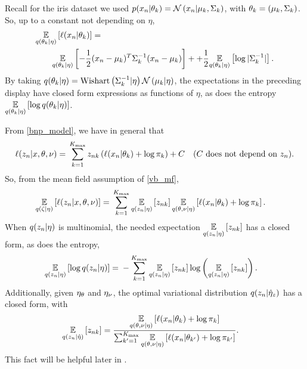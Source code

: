 \begin{ex}
%
Recall for the iris dataset we used $p(x_n \vert \theta_k) = \mathcal{N}\left(x_n \vert
\mu_k, \Sigma_k\right)$, with $\theta_k = (\mu_k, \Sigma_k)$.  So,
up to a constant not depending on $\eta$,
%
\begin{align*}
%
\MoveEqLeft
\expect{\q(\theta_\k \vert \eta)}{\logp(\x_\n \vert \theta_\k)} =\\
&
\expect{\q(\theta_\k \vert \eta)}{
-\frac{1}{2}(\x_n - \mu_k)^T \Sigma_\k^{-1} (\x_n - \mu_k)} +
+\frac{1}{2} \expect{\q(\theta_\k \vert \eta)}{\log |\Sigma_\k^{-1}|}.
%
\end{align*}
%
By taking $q(\theta_k \vert \eta) = \mathrm{Wishart}\left(\Sigma_k^{-1} \vert \eta\right)
\mathcal{N}\left(\mu_k \vert \eta\right)$, the expectations in the preceding display have closed
form expressions as functions of $\eta$, as does the entropy
$\underset{q(\theta_k \vert \eta)}{\mathbb{E}}\left[\log q(\theta_k \vert \eta)\right]$.
%
\end{ex}




\begin{ex}
%
From \eqref{bnp_model}, we have in general that
%
\begin{align*}
%
\logp(\z_n \vert \x, \theta, \nu) ={}&
\sum_{k=1}^{\kmax}
    \z_{\n\k} \left(
        \logp(\x_n \vert \theta_\k) + \log \pi_\k
    \right) + \const & \constdesc{\z_\n}.
%
\end{align*}
%
So, from the mean field assumption of \eqref{vb_mf},
%
\begin{align*}
%
\expect{\q(\zeta \vert \eta)}{\logp(\z_n \vert \x, \theta, \nu)} ={}&
\sum_{k=1}^{\kmax}
    \expect{\q(\z_\n \vert \eta)}{\z_{\n\k}}
    \expect{\q(\theta, \nu \vert \eta)}
           {\logp(\x_n \vert \theta_\k) + \log \pi_\k}.
%
\end{align*}
%
When $q(z_n \vert \eta)$ is multinomial, the needed expectation
$\underset{q(z_n \vert \eta)}{\mathbb{E}}\left[z_{nk}\right]$ has a closed form, as does the
entropy,
%
\begin{align*}
%
\expect{\q(\z_\n \vert \eta)}{\log \q(\z_\n \vert \eta)} ={}&
    - \sum_{\k=1}^{\kmax}
        \expect{\q(\z_\n \vert \eta)}{\z_{\n\k}}
        \log \left( \expect{\q(\z_\n \vert \eta)}{\z_{\n\k}} \right).
%
\end{align*}
%
Additionally, given $\eta_{\theta}$ and $\eta_{\nu}$, the optimal
variational distribution $q(z_n \vert \hat\eta_{z})$ has a closed form, with
%
\begin{align*}
%
\expect{\q(\z_\n \vert \etaopt)}{\z_{\n\k}} ={}&
\frac{
    \expect{\q(\theta, \nu \vert \eta)}
           {\logp(\x_n \vert \theta_\k) + \log \pi_\k}
}{
    \sum_{\k'=1}^{\kmax}
    \expect{\q(\theta, \nu \vert \eta)}
           {\logp(\x_n \vert \theta_{\k'}) + \log \pi_{\k'}}
}.
%
\end{align*}
%
This fact will be helpful later in .
%
\end{ex}

